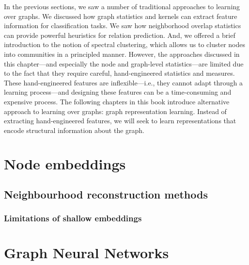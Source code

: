 In the previous sections, we saw a number of traditional approaches to learning
over graphs. We discussed how graph statistics and kernels can extract feature
information for classiﬁcation tasks. We saw how neighborhood overlap statistics
can provide powerful heuristics for relation prediction. And, we oﬀered a brief
introduction to the notion of spectral clustering, which allows us to cluster nodes
into communities in a principled manner. However, the approaches discussed in
this chapter—and especially the node and graph-level statistics—are limited due
to the fact that they require careful, hand-engineered statistics and measures.
These hand-engineered features are inﬂexible—i.e., they cannot adapt through
a learning process—and designing these features can be a time-consuming and
expensive process. The following chapters in this book introduce alternative
approach to learning over graphs: graph representation learning. Instead of
extracting hand-engineered features, we will seek to learn representations that
encode structural information about the graph.


\section{Node embeddings}
\subsection{Neighbourhood reconstruction methods}
\subsubsection{Limitations of shallow embeddings}

\section{Graph Neural Networks}

